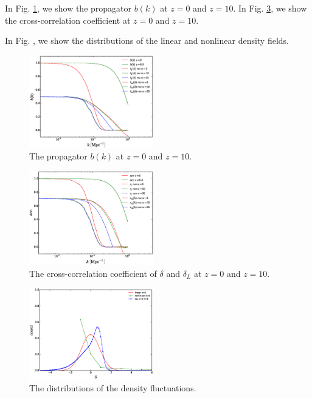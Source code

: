 \documentclass[aps,prd,twocolumn,showpacs,superscriptaddress,groupedaddress,nofootinbib]{revtex4}  %
\begin{document}
In Fig. \ref{fig:b}, we show the propagator $b(k)$ at $z=0$ and $z=10$.
In Fig. \ref{fig:xcc}, we show the cross-correlation coefficient at $z=0$ and 
$z=10$.

In Fig. , we show the distributions of the linear and nonlinear density 
fields.

\begin{figure}[tbp]
\begin{center}
\includegraphics[width=0.48\textwidth]{f3.eps}
\end{center}
\vspace{-0.7cm}
\caption{The propagator $b(k)$ at $z=0$ and $z=10$.}
\label{fig:b}
\end{figure}


\begin{figure}[tbp]
\begin{center}
\includegraphics[width=0.48\textwidth]{f4.eps}
\end{center}
\vspace{-0.7cm}
\caption{The cross-correlation coefficient of $\delta$ and $\delta_L$ 
at $z=0$ and $z=10$.}
\label{fig:xcc}
\end{figure}

\begin{figure}[tbp]
\begin{center}
\includegraphics[width=0.48\textwidth]{f9.eps}
\end{center}
\vspace{-0.7cm}
\caption{The distributions of the density fluctuations. }
\label{fig:xcc}
\end{figure}
\end{document}
